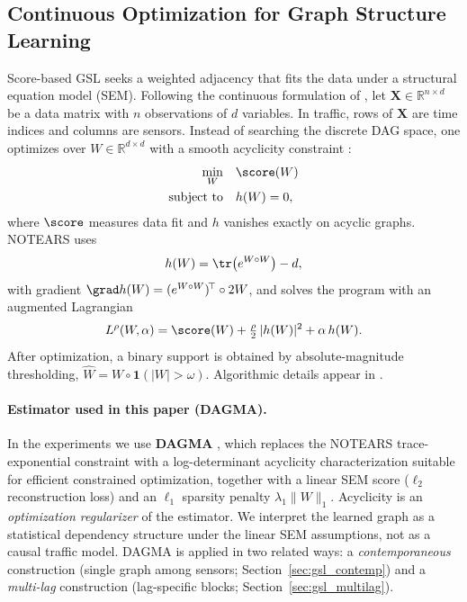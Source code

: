 \subsection{Continuous Optimization for Graph Structure Learning}\label{sec:method-notears}

Score-based GSL seeks a weighted adjacency that fits the data under a
structural equation model (SEM). Following the continuous formulation of
\citet{zheng2018dags}, let $\mathbf{X}\in\mathbb{R}^{n\times d}$ be a data
matrix with $n$ observations of $d$ variables. In traffic, rows of
$\mathbf{X}$ are time indices and columns are sensors. Instead of searching
the discrete DAG space, one optimizes over
$W\in\mathbb{R}^{d\times d}$ with a smooth acyclicity constraint
\citep{zheng2018dags}:
\begin{align}
\label{eq:main:idea}
\begin{aligned}
\min_{W} &\quad \score(W)\\
\text{subject to} &\quad h(W)=0,
\end{aligned}
\end{align}
where $\score$ measures data fit and $h$ vanishes exactly on acyclic graphs.
NOTEARS uses
\begin{equation}\label{eq:def:h}
h(W)=\tr\bigl(e^{W\circ W}\bigr)-d,
\end{equation}
with gradient
$\grad h(W)=(e^{W\circ W})^{\!\top}\circ 2W$, and solves the program with an
augmented Lagrangian
\begin{equation}
L^{\rho}(W,\alpha)=\score(W)+\tfrac{\rho}{2}\,|h(W)|^{2}+\alpha\,h(W).
\end{equation}
After optimization, a binary support is obtained by absolute-magnitude
thresholding, $\widehat{W}=W\circ\mathbf{1}(|W|>\omega)$. Algorithmic details
appear in \citep{zheng2018dags}.

\paragraph{Estimator used in this paper (DAGMA).}
In the experiments we use \textbf{DAGMA} \citep{Bello2024DAGMA}, which
replaces the NOTEARS trace-exponential constraint with a log-determinant
acyclicity characterization suitable for efficient constrained optimization,
together with a linear SEM score ($\ell_2$ reconstruction loss) and an
$\ell_1$ sparsity penalty $\lambda_1\lVert W\rVert_1$. Acyclicity is an
\emph{optimization regularizer} of the estimator. We interpret the learned
graph as a statistical dependency structure under the linear SEM assumptions,
not as a causal traffic model. DAGMA is applied in two related ways:
a \emph{contemporaneous} construction (single graph among sensors;
Section~\ref{sec:gsl_contemp}) and a \emph{multi-lag} construction
(lag-specific blocks; Section~\ref{sec:gsl_multilag}).

